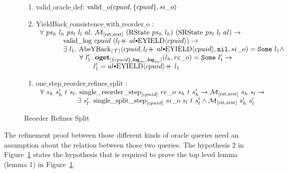 \begin{figure}
\noindent{}
\begin{enumerate}
\item valid$\_$oracle$\_$def: ${\mathrm{valid}\_\mathrm{o}}({cpuid}, {\{cpuid\}}, {si\_o })$
\item YieldBack$\_$consistence$\_$with$\_$reorder$\_$o :\\
$
\begin{array}{l}
\forall \ ps_h \ l_h \ ps_l \ l_l \ al.\ \matchrstatesrstate{(\rstate{ps_h}{l_h})}{(\srstate{ps_l}{l_l}{al})} \rightarrow \\
\ \ \ \ \ \ \ \ \ \ \validlog{cpuid}{(\listconsoppo{\yieldev{cpuid}}{\listappoppo{al}{l_l}})} \rightarrow \\
\ \ \ \ \ \ \ \ \ \ \exists\ l_1. \ \yieldbackfunc{\timebound}{cpuid}{\listconsoppo{\yieldev{cpuid}}{\listappoppo{al}{l_l}}}{\nulllist}{si\_o}{l_1} \wedge \\ 
\ \ \ \ \ \ \ \ \ \ \ \ \ \ \ \ \ \forall \ l_1' .\  \oget{\set{cpuid}}{\mclog}{\mclog}{l_h}{re\_o}{l_1'} \rightarrow \\ 
\ \ \ \ \ \ \ \ \ \ \ \ \ \ \ \ \  \ \ \ \ \ \ l_1' = \listappoppo{l_1}{\listconsoppo{\yieldev{cpuid}}{al}} \\
\end{array}
$
\end{enumerate}

\noindent{}
\begin{enumerate}
\item one$\_$step$\_$reorder$\_$refines$\_$split : \\
$
\begin{array}{l}
\forall \ s_h \ s_h' \ t \ s_l . \ \singlereorderstep{cpuid}{re\_o}{s_h}{t}{s_h'} \rightarrow  \matchrstatesrstate{s_h}{s_l} \rightarrow \\
\ \ \ \ \ \ \ \ \ \ \ \ \ \ \ \ \exists\ s_l' .\ \singlesplitstep{cpuid}{si\_o}{s_l}{t}{s_l'} \wedge  \matchrstatesrstate{s_h'}{s_l'}\\
\end{array}
$
\end{enumerate}
\caption{Reorder Refines Split}
\label{fig:chapter:conlink:reorder-refines-split}
\end{figure}
The refinement proof between those different kinds of 
oracle queries need an assumption about the relation between those two queries. 
The hypothesis 2 in Figure~\ref{fig:chapter:conlink:reorder-refines-split} 
states the hypothesis that is 
required to prove the top level lemma (lemma 1) in Figure~\ref{fig:chapter:conlink:reorder-refines-split}.

